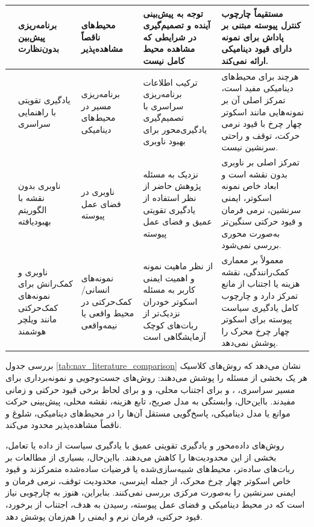 \begin{longtable}{|C{2.35cm}|P{2.35cm}|P{2.65cm}|P{3.45cm}|P{3.95cm}|}
	\cite{Luo2025UP3} &
	برنامه‌ریزی پیش‌بین بدون‌نظارت  &
	محیط‌های ناقصاً مشاهده‌پذیر &
	توجه به پیش‌بینی آینده و تصمیم‌گیری در شرایطی که مشاهده محیط کامل نیست &
	مستقیماً چارچوب کنترل پیوسته مبتنی بر پاداش برای نمونه دارای قیود دینامیکی ارائه نمی‌کند. \\
	\hline
	
	\cite{Wang2020G2RL} &
	یادگیری تقویتی با راهنمایی سراسری &
	برنامه‌ریزی مسیر در محیط‌های دینامیکی &
	ترکیب اطلاعات برنامه‌ریزی سراسری با تصمیم‌گیری یادگیری‌محور برای بهبود ناوبری &
	هرچند برای محیط‌های دینامیکی مفید است، تمرکز اصلی آن بر نمونه‌هایی مانند اسکوتر چهار چرخ با قیود نرمی حرکت، توقف و راحتی سرنشین نیست. \\
	\hline
	
	\cite{Nasti2025MaplessTD3} &
	ناوبری بدون نقشه با الگوریتم بهبودیافته  &
	ناوبری  در فضای عمل پیوسته &
	نزدیک به مسئله پژوهش حاضر از نظر استفاده از یادگیری تقویتی عمیق و فضای عمل پیوسته &
	تمرکز اصلی بر ناوبری بدون نقشه است و ابعاد خاص نمونه اسکوتر، ایمنی سرنشین، نرمی فرمان و قیود حرکتی سنگین‌تر به‌صورت محوری بررسی نمی‌شود. \\
	\hline
	
	\cite{Pacini2024RLwheelchair,Cui2025OutdoorWheelchair} &
	ناوبری و کمک‌رانش برای نمونه‌های کمک‌حرکتی مانند ویلچر هوشمند &
	نمونه‌های انسانی/کمک‌حرکتی در محیط واقعی یا نیمه‌واقعی &
	از نظر ماهیت نمونه و اهمیت ایمنی کاربر به مسئله اسکوتر خودران نزدیک‌تر از ربات‌های کوچک آزمایشگاهی است &
	معمولاً بر معماری کمک‌رانندگی، نقشه هزینه یا اجتناب از مانع تمرکز دارد و چارچوب کامل یادگیری سیاست پیوسته برای اسکوتر چهار چرخ محرک را پوشش نمی‌دهد. \\
	\hline
	
\end{longtable}

\endgroup

بررسی جدول \ref{tab:nav_literature_comparison} نشان می‌دهد که روش‌های کلاسیک هر یک بخشی از مسئله را پوشش می‌دهند: روش‌های جست‌وجویی و نمونه‌برداری برای مسیر سراسری، ،  و  برای اجتناب محلی، و  و  برای لحاظ برخی قیود حرکتی و زمانی مفیدند. بااین‌حال، وابستگی به مدل صریح، تابع هزینه، نقشه محلی، پیش‌بینی حرکت موانع یا مدل دینامیکی، پاسخ‌گویی مستقل آن‌ها را در محیط‌های دینامیکی، شلوغ و ناقصاً مشاهده‌پذیر محدود می‌کند.

روش‌های داده‌محور و یادگیری تقویتی عمیق با یادگیری سیاست از داده یا تعامل، بخشی از این محدودیت‌ها را کاهش می‌دهند. بااین‌حال، بسیاری از مطالعات بر ربات‌های ساده‌تر، محیط‌های شبیه‌سازی‌شده یا فرضیات ساده‌شده متمرکزند و قیود خاص اسکوتر چهار چرخ محرک، از جمله اینرسی، محدودیت توقف، نرمی فرمان و ایمنی سرنشین را به‌صورت مرکزی بررسی نمی‌کنند. بنابراین، هنوز به چارچوبی نیاز است که در محیط دینامیکی و فضای عمل پیوسته، رسیدن به هدف، اجتناب از برخورد، قیود حرکتی، فرمان نرم و ایمنی را هم‌زمان پوشش دهد.

